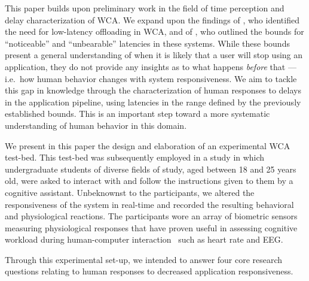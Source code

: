\documentclass[10pt,letterpaper]{article}
\providecommand{\DIFaddtex}[1]{#1} %
\providecommand{\DIFdeltex}[1]{} %
\providecommand{\DIFaddbegin}{\protect\color{blue}} %
\providecommand{\DIFaddend}{\protect\color{black}} %
\providecommand{\DIFdelbegin}{\protect\color{red}} %
\providecommand{\DIFdelend}{\protect\color{black}} %
\providecommand{\DIFadd}[1]{\texorpdfstring{\DIFaddtex{#1}}{#1}} %
\providecommand{\DIFdel}[1]{\texorpdfstring{\DIFdeltex{#1}}{}} %
\newcommand{\DIFscaledelfig}{0.5}
\newlength{\DIFdelgraphicswidth} %
\newlength{\DIFdelgraphicsheight} %
\newcommand{\DIFaddincludegraphics}[2][]{{\color{blue}\fbox{\DIFOincludegraphics[#1]{#2}}}} %
\newcommand{\DIFdelincludegraphics}[2][]{%
\sbox{\DIFdelgraphicsbox}{\DIFOincludegraphics[#1]{#2}}%
\settoboxwidth{\DIFdelgraphicswidth}{\DIFdelgraphicsbox} %
\settoboxtotalheight{\DIFdelgraphicsheight}{\DIFdelgraphicsbox} %
\scalebox{\DIFscaledelfig}{%
\parbox[b]{\DIFdelgraphicswidth}{\usebox{\DIFdelgraphicsbox}\\[-\baselineskip] \rule{\DIFdelgraphicswidth}{0em}}\llap{\resizebox{\DIFdelgraphicswidth}{\DIFdelgraphicsheight}{%
\setlength{\unitlength}{\DIFdelgraphicswidth}%
\begin{picture}(1,1)%
\thicklines\linethickness{2pt} %
{\color[rgb]{1,0,0}\put(0,0){\framebox(1,1){}}}%
{\color[rgb]{1,0,0}\put(0,0){\line( 1,1){1}}}%
{\color[rgb]{1,0,0}\put(0,1){\line(1,-1){1}}}%
\end{picture}%
}\hspace*{3pt}}} %
} %
\DeclareRobustCommand{\DIFaddbegin}{\DIFOaddbegin \let\includegraphics\DIFaddincludegraphics} %
\DeclareRobustCommand{\DIFaddend}{\DIFOaddend \let\includegraphics\DIFOincludegraphics} %
\DeclareRobustCommand{\DIFdelbegin}{\DIFOdelbegin \let\includegraphics\DIFdelincludegraphics} %
\DeclareRobustCommand{\DIFdelend}{\DIFOaddend \let\includegraphics\DIFOincludegraphics} %
\begin{document}
This paper builds upon preliminary work in the field of time perception and delay characterization of WCA.\@
We expand upon the findings of \textcite{Ha:TowardsWearableCogAssist}, who identified the need for low-latency offloading in WCA, and of \textcite{Chen:AnEmpiricalStudyOfLatency}, who outlined the bounds for ``noticeable'' and ``unbearable'' latencies in these systems.
While these bounds present a general understanding of when it is likely that a user will \DIFdelbegin \DIFdel{drop }\DIFdelend \DIFaddbegin \DIFadd{stop using }\DIFaddend an application, they do not provide any insights as to what happens \emph{before} that --- i.e.\DIFaddbegin \DIFadd{\ }\DIFaddend how human behavior changes with system responsiveness.
We aim to tackle this \DIFdelbegin \DIFdel{question }\DIFdelend \DIFaddbegin \DIFadd{gap in knowledge }\DIFaddend through the characterization of human responses to delays in the application pipeline, using latencies in the range defined by the previously established bounds.
This is an important step toward a more systematic understanding of human behavior in this domain.

We present in this paper \DIFaddbegin \DIFadd{the design and elaboration of }\DIFaddend an experimental WCA test-bed\DIFdelbegin \DIFdel{of our design and making}\DIFdelend .
This test-bed was subsequently employed in a study in which undergraduate students \DIFaddbegin \DIFadd{of diverse fields of study, aged between 18 and 25 years old, }\DIFaddend were asked to interact with and follow the instructions given to them by a cognitive assistant.
Unbeknownst to the participants, we altered the responsiveness of the system in real-time and recorded the resulting behavioral and physiological reactions. 
The participants wore an array of biometric sensors measuring physiological responses that have proven useful in assessing cognitive workload during human-computer interaction~\autocite{haapalainen2010psycho,kumar2016measurement} such as heart rate and EEG.\@

\DIFdelbegin \DIFdel{Our results indicate that reduced responsiveness in WCA systems leads to a disruption of participants' cognitive plan for the task.
This is evidenced by an emergent pacing effect on user actions as system responsiveness is reduced.
While it would seem self-evident that users take longer to complete a task while using a system with low responsiveness --- as they have to wait longer for new instructions --- our study found that user slow-down represents a source of substantial additional delay.
To be more precise, the data indicate that users slow down not only because they have to wait for the system to catch up, but that their reactions to new instructions is also delayed.
Furthermore, this effect persists for a while after system response improves and is modulated by intrinsic personality traits, in particular, \emph{neuroticism}~}%
\DIFdel{, which has previously been connected to intolerance for time delay~}%
\DIFdel{. 
}\DIFdelend \DIFaddbegin \DIFadd{Through this experimental set-up, we intended to answer four core research questions relating to human responses to decreased application responsiveness.
}\DIFaddend 
\end{document}
